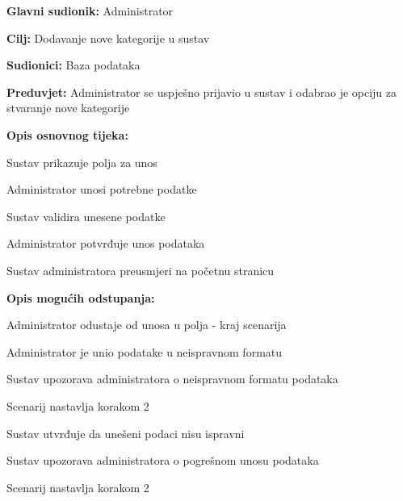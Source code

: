 					\noindent {}
					\begin{packed_item}
	
						\item \textbf{Glavni sudionik: }Administrator
						\item  \textbf{Cilj:} Dodavanje nove kategorije u sustav
						\item  \textbf{Sudionici:} Baza podataka
						\item  \textbf{Preduvjet:} Administrator se uspješno prijavio u sustav i odabrao je opciju za stvaranje nove kategorije
						\item  \textbf{Opis osnovnog tijeka:}
						
						\item[] \begin{packed_enum}
							\item Sustav prikazuje polja za unos
							\item Administrator unosi potrebne podatke
							\item Sustav validira unesene podatke
							\item Administrator potvrđuje unos podataka
							\item Sustav administratora preusmjeri na početnu stranicu
						\end{packed_enum}
						\eject
						\item  \textbf{Opis mogućih odstupanja:}

						\item[] \begin{packed_item}
							\item[2.a] Administrator odustaje od unosa u polja - kraj scenarija
							\item[3.a] Administrator je unio podatake u neispravnom formatu
							\item[] \begin{packed_enum}
								\item Sustav upozorava administratora o neispravnom formatu podataka
								\item Scenarij nastavlja korakom 2 
							\end{packed_enum}	
							\item[5.a] Sustav utvrđuje da unešeni podaci nisu ispravni
							\item[] \begin{packed_enum}
								\item Sustav upozorava administratora o pogrešnom unosu podataka
								\item Scenarij nastavlja korakom 2 
							\end{packed_enum}					
						\end{packed_item}
					\end{packed_item}

